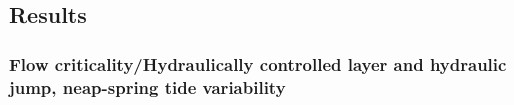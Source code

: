 

\subsection{Results}


\subsubsection{Flow criticality/Hydraulically controlled layer and hydraulic jump, neap-spring tide variability}


